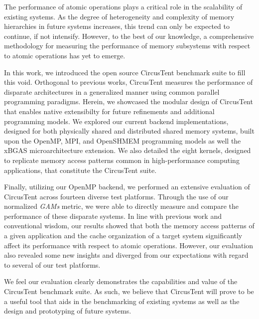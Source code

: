 
The performance of atomic operations plays a critical role in the scalability of existing systems.
As the degree of heterogeneity and complexity of memory hierarchies in future systems increases, this trend can only be expected to continue, if not intensify.
However, to the best of our knowledge, a comprehensive methodology for measuring the performance of memory subsystems with respect to atomic operations has yet to emerge.

In this work, we introduced the open source CircusTent benchmark suite to fill this void.
Orthogonal to previous works, CircusTent measures the performance of disparate architectures in a generalized manner using common parallel programming paradigms.
Herein, we showcased the modular design of CircusTent that enables native extensibilty for future refinements and additional programming models.
We explored our current backend implementations, designed for both physically shared and distributed shared memory systems, built upon the OpenMP, MPI, and OpenSHMEM programming models as well the xBGAS microarchitecture extension.
We also detailed the eight kernels, designed to replicate memory access patterns common in high-performance computing applications, that constitute the CircusTent suite.

Finally, utilizing our OpenMP backend, we performed an extensive evaluation of CircusTent across fourteen diverse test platforms.
Through the use of our normalized \textit{GAMs} metric, we were able to directly measure and compare the performance of these disparate systems.
In line with previous work and conventional wisdom, our results showed that both the memory access patterns of a given application and the cache organization of a target system significantly affect its performance with respect to atomic operations.
However, our evaluation also revealed some new insights and diverged from our expectations with regard to several of our test platforms.

We feel our evaluation clearly demonstrates the capabilities and value of the CircusTent benchmark suite.
As such, we believe that CircusTent will prove to be a useful tool that aids in the benchmarking of existing systems as well as the design and prototyping of future systems.